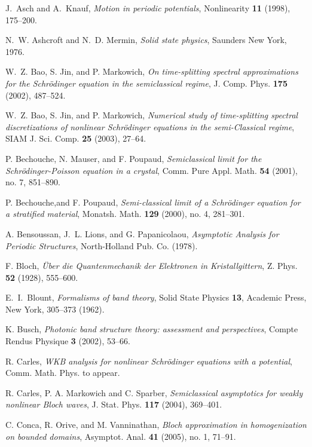 \documentclass[leqno,final]{siamltex}
\numberwithin{equation}{section}
\newcounter{me}
\begin{document}
\begin{thebibliography}{99}

  {\sc J.\ Asch and A.\ Knauf}, {\em Motion in periodic
potentials}, Nonlinearity {\bf 11} (1998), 175--200.

 {\sc N.~W. Ashcroft and N.~D. Mermin},
\emph{Solid state physics}, Saunders New York, 1976.

 {\sc W.~Z. Bao, S. Jin, and P. Markowich},
\emph{On time-splitting spectral approximations for the
Schr\"odinger equation in the semiclassical regime},
J. Comp. Phys. {\bf 175} (2002), 487--524.

 {\sc W.~Z. Bao, S. Jin, and P. Markowich},
\emph{Numerical study of time-splitting spectral discretizations
of nonlinear Schr\"odinger equations in the semi-Classical regime},
SIAM J. Sci. Comp. {\bf 25} (2003), 27--64.

 {\sc P. Bechouche, N. Mauser, and F. Poupaud},
\emph{Semiclassical limit for the
Schr\"odinger-Poisson equation in a crystal}, Comm. Pure Appl. Math.
\textbf{54} (2001),  no. 7, 851--890.

 {\sc P. Bechouche,and F. Poupaud},
\emph{Semi-classical limit of a Schr\"odinger equation for a
stratified material}, Monatsh. Math. {\bf 129} (2000), no. 4,
281--301.

 A. Bensoussan, J.~L. Lions, and G. Papanicolaou,
\emph{Asymptotic Analysis for Periodic Structures}, North-Holland
Pub. Co. (1978).

 F. Bloch, \emph{\"Uber die Quantenmechanik der Elektronen
in Kristallgittern}, Z. Phys. \textbf{52} (1928), 555--600.

 E.\ I.\ Blount, {\em Formalisms of band theory},
Solid State Physics {\bf 13}, Academic Press, New York, 305--373
(1962).

 K. Busch, \emph{Photonic band structure theory:
assessment and perspectives}, Compte Rendus Physique {\bf 3}
(2002), 53--66.

 R. Carles, \emph{WKB analysis for nonlinear
Schr\"odinger equations with a potential}, Comm. Math. Phys. to appear.

 R. Carles, P. A. Markowich and C. Sparber,
\emph{Semiclassical asymptotics for weakly nonlinear
Bloch waves}, J. Stat. Phys. \textbf{117} (2004), 369--401.

 C. Conca, R. Orive, and M. Vanninathan,
\emph{Bloch approximation in homogenization on bounded domains},
Asymptot. Anal. {\bf 41} (2005), no. 1, 71--91.


\end{thebibliography}
\end{document}
